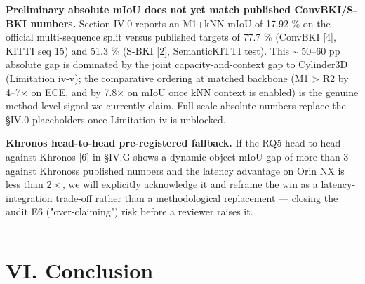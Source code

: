 \documentclass[
]{article}
\begin{document}
\textbf{Preliminary absolute mIoU does not yet match published
ConvBKI/S-BKI numbers.} Section IV.0 reports an M1+kNN mIoU of 17.92 \%
on the official multi-sequence split versus published targets of 77.7 \%
(ConvBKI {[}4{]}, KITTI seq 15) and 51.3 \% (S-BKI {[}2{]},
SemanticKITTI test). This \textasciitilde{} 50--60 pp absolute gap is
dominated by the joint capacity-and-context gap to Cylinder3D
(Limitation iv-v); the comparative ordering at matched backbone (M1
\textgreater{} R2 by 4--7× on ECE, and by 7.8× on mIoU once kNN context
is enabled) is the genuine method-level signal we currently claim.
Full-scale absolute numbers replace the §IV.0 placeholders once
Limitation iv is unblocked.

\textbf{Khronos head-to-head pre-registered fallback.} If the RQ5
head-to-head against Khronos {[}6{]} in §IV.G shows a dynamic-object
mIoU gap of more than 3 against Khronos\textquotesingle s published
numbers and the latency advantage on Orin NX is less than \(2\times\),
we will explicitly acknowledge it and reframe the win as a
latency-integration trade-off rather than a methodological replacement
--- closing the audit E6 ("over-claiming") risk before a reviewer raises
it.

\begin{center}\rule{0.5\linewidth}{0.5pt}\end{center}

\section{VI. Conclusion}\label{vi-conclusion}
\end{document}
